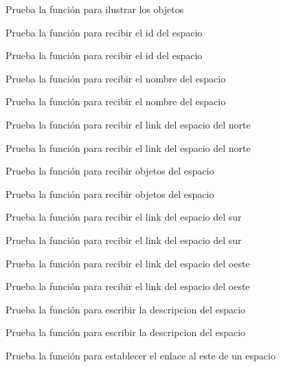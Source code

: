 \begin{DoxyRefList}
Prueba la función para ilustrar los objetos  
\item[\label{test__test000056}%
\Hypertarget{test__test000056}%
Member \hyperlink{space__test_8c_af9087176b0d3c41d83a17a4918b13e31}{test2\+\_\+space\+\_\+get\+\_\+id} ()]Prueba la función para recibir el id del espacio 

Prueba la función para recibir el id del espacio  
\item[\label{test__test000044}%
\Hypertarget{test__test000044}%
Member \hyperlink{space__test_8c_aee88ed31c63efc674051a4563aed86e2}{test2\+\_\+space\+\_\+get\+\_\+name} ()]Prueba la función para recibir el nombre del espacio 

Prueba la función para recibir el nombre del espacio  
\item[\label{test__test000048}%
\Hypertarget{test__test000048}%
Member \hyperlink{space__test_8c_a61891c9cebb9d26dc9f149ad8341517c}{test2\+\_\+space\+\_\+get\+\_\+north} ()]Prueba la función para recibir el link del espacio del norte 

Prueba la función para recibir el link del espacio del norte  
\item[\label{test__test000046}%
\Hypertarget{test__test000046}%
Member \hyperlink{space__test_8c_a0fe857c34f691aaba197d03315c3955f}{test2\+\_\+space\+\_\+get\+\_\+object} ()]Prueba la función para recibir objetos del espacio 

Prueba la función para recibir objetos del espacio  
\item[\label{test__test000050}%
\Hypertarget{test__test000050}%
Member \hyperlink{space__test_8c_a40fe07c07c1069023b362a9e506c4c59}{test2\+\_\+space\+\_\+get\+\_\+south} ()]Prueba la función para recibir el link del espacio del sur 

Prueba la función para recibir el link del espacio del sur  
\item[\label{test__test000054}%
\Hypertarget{test__test000054}%
Member \hyperlink{space__test_8c_af1cf02b01c007aec0684186b39666c32}{test2\+\_\+space\+\_\+get\+\_\+west} ()]Prueba la función para recibir el link del espacio del oeste 

Prueba la función para recibir el link del espacio del oeste  
\item[\label{test__test000058}%
\Hypertarget{test__test000058}%
Member \hyperlink{space__test_8c_ab3dd07cbead60f87866e2bd2c426da0f}{test2\+\_\+space\+\_\+set\+\_\+description} ()]Prueba la función para escribir la descripcion del espacio 

Prueba la función para escribir la descripcion del espacio  
\item[\label{test__test000038}%
\Hypertarget{test__test000038}%
Member \hyperlink{space__test_8c_a5df66d103388be4518c379b224f53770}{test2\+\_\+space\+\_\+set\+\_\+east} ()]Prueba la función para establecer el enlace al este de un espacio 


\end{DoxyRefList}
